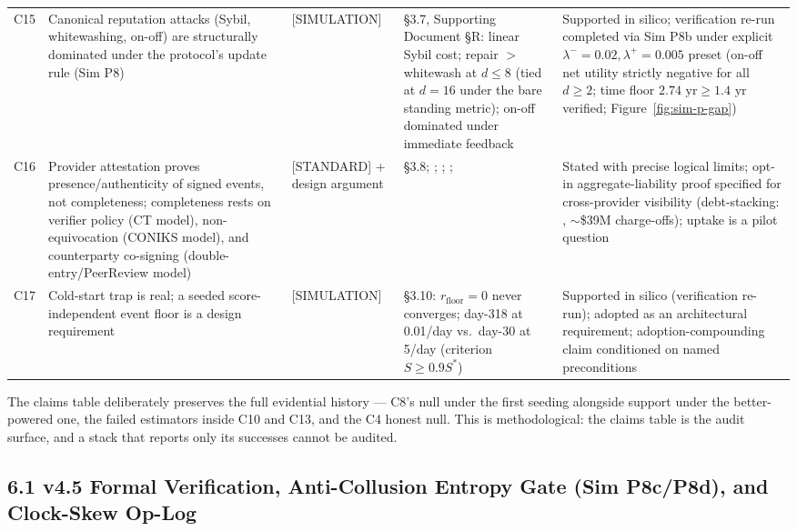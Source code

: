 \documentclass[11pt,twocolumn]{article}
\begin{document}
\begin{table}[t]
\begin{tabular}{@{}l p{4.35cm} p{2.3cm} p{3.95cm} p{5.35cm}@{}}
C15 & Canonical reputation attacks (Sybil, whitewashing, on-off) are structurally dominated under the protocol's update rule (Sim P8) & [SIMULATION] & \S3.7, Supporting Document \S R: linear Sybil cost; repair $>$ whitewash at $d \leq 8$ (tied at $d = 16$ under the bare standing metric); on-off dominated under immediate feedback & Supported in silico; verification re-run completed via Sim P8b under explicit $\lambda^- = 0.02, \lambda^+ = 0.005$ preset (on-off net utility strictly negative for all $d \ge 2$; time floor $2.74\text{ yr} \ge 1.4\text{ yr}$ verified; Figure~\ref{fig:sim-p-gap}) \\
C16 & Provider attestation proves presence/authenticity of signed events, not completeness; completeness rests on verifier policy (CT model), non-equivocation (CONIKS model), and counterparty co-signing (double-entry/PeerReview model) & [STANDARD] + design argument & \S3.8; \citealp{rfc6962}; \citealp{melara2015}; \citealp{haeberlen2007}; \citealp{cfpb2024} & Stated with precise logical limits; opt-in aggregate-liability proof specified for cross-provider visibility (debt-stacking: \citealp{transunion2015}, $\sim$\$39M charge-offs); uptake is a pilot question \\
C17 & Cold-start trap is real; a seeded score-independent event floor is a design requirement & [SIMULATION] & \S3.10: $r_{\mathrm{floor}} = 0$ never converges; day-318 at 0.01/day vs.\ day-30 at 5/day (criterion $S \geq 0.9 S^*$) & Supported in silico (verification re-run); adopted as an architectural requirement; adoption-compounding claim conditioned on named preconditions \\
\bottomrule
\end{tabular}
\end{table}


The claims table deliberately preserves the full evidential history ---
C8's null under the first seeding alongside support under the better-powered
one, the failed estimators inside C10 and C13, and the C4 honest
null. This is methodological: the claims table is the audit surface, and a
stack that reports only its successes cannot be audited.


\FloatBarrier
\subsection*{6.1 v4.5 Formal Verification, Anti-Collusion Entropy Gate (Sim P8c/P8d), and Clock-Skew Op-Log}
\end{document}
